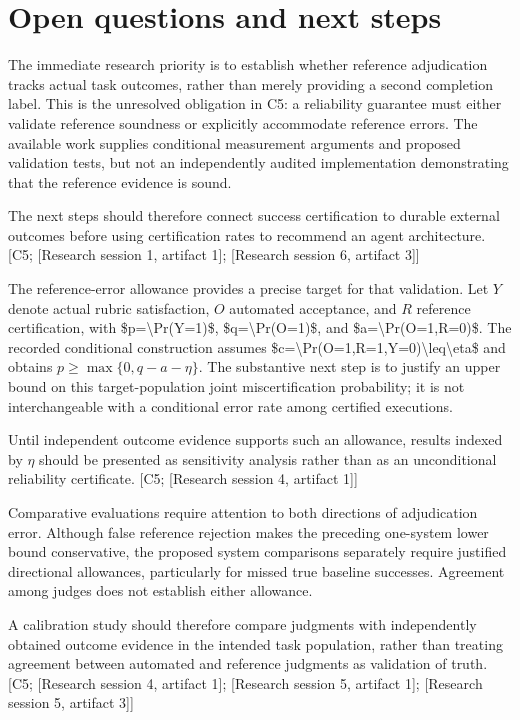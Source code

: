 \documentclass[11pt]{article}
\begin{document}
\section{Open questions and next steps}
The immediate research priority is to establish whether reference adjudication tracks actual task outcomes, rather than merely providing a second completion label. This is the unresolved obligation in C5: a reliability guarantee must either validate reference soundness or explicitly accommodate reference errors. The available work supplies conditional measurement arguments and proposed validation tests, but not an independently audited implementation demonstrating that the reference evidence is sound.

The next steps should therefore connect success certification to durable external outcomes before using certification rates to recommend an agent architecture. [C5; [Research session 1, artifact 1]; [Research session 6, artifact 3]]

The reference-error allowance provides a precise target for that validation. Let $Y$ denote actual rubric satisfaction, $O$ automated acceptance, and $R$ reference certification, with \$p=\textbackslash{}Pr(Y=1)\$, \$q=\textbackslash{}Pr(O=1)\$, and \$a=\textbackslash{}Pr(O=1,R=0)\$. The recorded conditional construction assumes \$c=\textbackslash{}Pr(O=1,R=1,Y=0)\textbackslash{}leq\textbackslash{}eta\$ and obtains $p\geq\max\{0,q-a-\eta\}$. The substantive next step is to justify an upper bound on this target-population joint miscertification probability; it is not interchangeable with a conditional error rate among certified executions.

Until independent outcome evidence supports such an allowance, results indexed by $\eta$ should be presented as sensitivity analysis rather than as an unconditional reliability certificate. [C5; [Research session 4, artifact 1]]

Comparative evaluations require attention to both directions of adjudication error. Although false reference rejection makes the preceding one-system lower bound conservative, the proposed system comparisons separately require justified directional allowances, particularly for missed true baseline successes. Agreement among judges does not establish either allowance.

A calibration study should therefore compare judgments with independently obtained outcome evidence in the intended task population, rather than treating agreement between automated and reference judgments as validation of truth. [C5; [Research session 4, artifact 1]; [Research session 5, artifact 1]; [Research session 5, artifact 3]]
\end{document}
